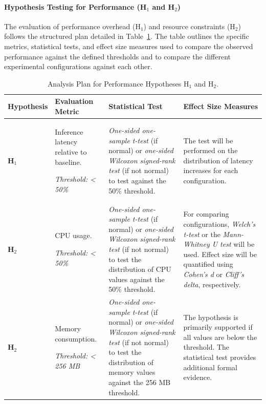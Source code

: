 \paragraph{Hypothesis Testing for Performance (H$_1$ and H$_2$)}
The evaluation of performance overhead (H$_1$) and resource constraints (H$_2$) follows the structured plan detailed in Table~\ref{tab:analysis_plan_h1_h2}. The table outlines the specific metrics, statistical tests, and effect size measures used to compare the observed performance against the defined thresholds and to compare the different experimental configurations against each other.

\begin{table}[htbp]
    \caption{Analysis Plan for Performance Hypotheses H$_1$ and H$_2$.}
    \label{tab:analysis_plan_h1_h2}
    \begin{tabularx}{\linewidth}{@{}>{\raggedright\arraybackslash}p{} >{\raggedright\arraybackslash}p{} >{\raggedright\arraybackslash}X >{\raggedright\arraybackslash}p{}@{}}
        \toprule
        \textbf{Hypo\-thesis} & \textbf{Evaluation Metric} & \textbf{Statistical Test} & \textbf{Effect Size Measures} \\
        \midrule
        \textbf{H$_1$} & Inference latency relative to baseline.
        
        \textit{Threshold: < 50\%} & 
        \textit{One-sided one-sample t-test} (if normal) or \textit{one-sided Wilcoxon signed-rank test} (if not normal) to test against the 50\% threshold. &
        The test will be performed on the distribution of latency increases for each configuration. \\
        \addlinespace
        \textbf{H$_2$} & CPU usage. 
        
        \textit{Threshold: < 50\%} & 
        \textit{One-sided one-sample t-test} (if normal) or \textit{one-sided Wilcoxon signed-rank test} (if not normal) to test the distribution of CPU values against the 50\% threshold. & 
        For comparing configurations, \textit{Welch's t-test} or the \textit{Mann-Whitney U test} will be used. Effect size will be quantified using \textit{Cohen's d} or \textit{Cliff's delta}, respectively. \\
        \addlinespace
        \textbf{H$_2$} & Memory consumption. 
        
        \textit{Threshold: < 256 MB} & 
        \textit{One-sided one-sample t-test} (if normal) or \textit{one-sided Wilcoxon signed-rank test} (if not normal) to test the distribution of memory values against the 256 MB threshold. &
        The hypothesis is primarily supported if all values are below the threshold. The statistical test provides additional formal evidence. \\
        \bottomrule
    \end{tabularx}
\end{table}

